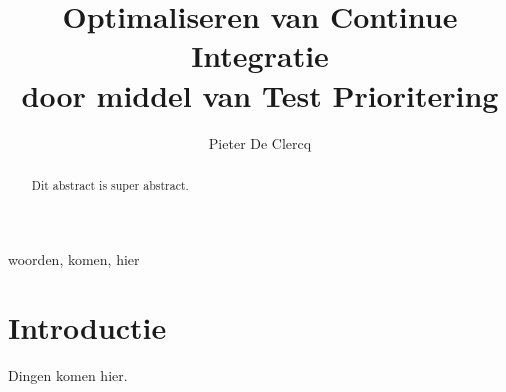 \documentclass[10pt,twocolumn,twoside]{phdsymp-nl}
\begin{document}
	\title{Optimaliseren van Continue Integratie\\ door middel van Test Prioritering}
	\author{Pieter De Clercq}
	\maketitle
	
	\begin{abstract}
		Dit abstract is super abstract.
	\end{abstract}

	\begin{keywords}
		woorden, komen, hier
	\end{keywords}

	\section{Introductie}
	Dingen komen hier. \cite{cusumanomicrosoft}
	
	
	
\end{document}
